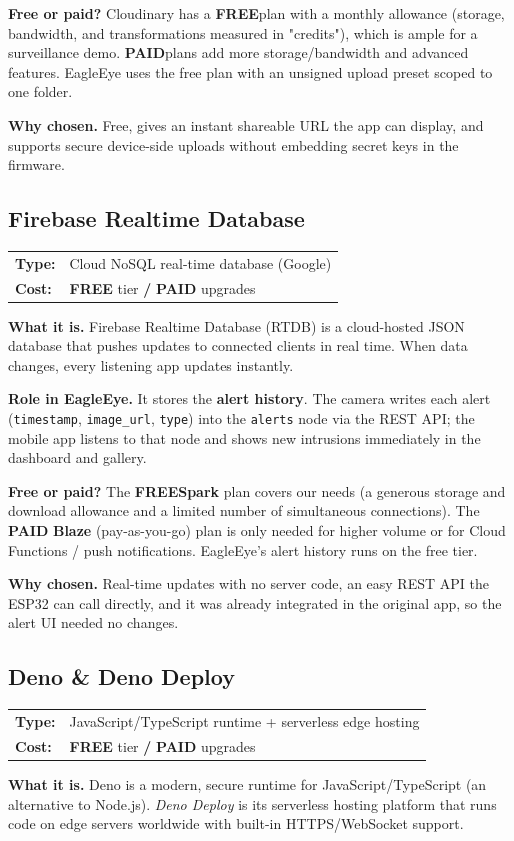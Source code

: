 \documentclass[11pt,a4paper]{article}
\makeatletter
\newcommand{\code}[1]{\texttt{#1}}
\newcommand{\free}{\textbf{\color{freegreen}FREE}}
\newcommand{\paid}{\textbf{\color{paidorange}PAID}}
\newcommand{\freepaid}{\textbf{\color{freegreen}FREE} tier \textbf{/} \textbf{\color{paidorange}PAID} upgrades}
\newcommand{\techhead}[2]{\par\vspace{0.3em}\noindent
  \begin{tabularx}{\linewidth}{@{}lX@{}}
  \textbf{Type:} & #1 \\
  \textbf{Cost:} & #2 \\
  \end{tabularx}\par\vspace{0.3em}}
\makeatother
\begin{document}
\textbf{Free or paid?} Cloudinary has a \free plan with a monthly allowance (storage,
bandwidth, and transformations measured in "credits"), which is ample for a surveillance demo.
\paid plans add more storage/bandwidth and advanced features. EagleEye uses the free plan with
an unsigned upload preset scoped to one folder.

\textbf{Why chosen.} Free, gives an instant shareable URL the app can display, and supports
secure device-side uploads without embedding secret keys in the firmware.

\subsection{Firebase Realtime Database}
\techhead{Cloud NoSQL real-time database (Google)}{\freepaid}
\textbf{What it is.} Firebase Realtime Database (RTDB) is a cloud-hosted JSON database that
pushes updates to connected clients in real time. When data changes, every listening app
updates instantly.

\textbf{Role in EagleEye.} It stores the \textbf{alert history}. The camera writes each alert
(\code{timestamp}, \code{image\_url}, \code{type}) into the \code{alerts} node via the REST
API; the mobile app listens to that node and shows new intrusions immediately in the dashboard
and gallery.

\textbf{Free or paid?} The \free \textbf{Spark} plan covers our needs (a generous storage and
download allowance and a limited number of simultaneous connections). The \paid
\textbf{Blaze} (pay-as-you-go) plan is only needed for higher volume or for Cloud Functions /
push notifications. EagleEye's alert history runs on the free tier.

\textbf{Why chosen.} Real-time updates with no server code, an easy REST API the ESP32 can call
directly, and it was already integrated in the original app, so the alert UI needed no changes.

\subsection{Deno \& Deno Deploy}
\techhead{JavaScript/TypeScript runtime + serverless edge hosting}{\freepaid}
\textbf{What it is.} Deno is a modern, secure runtime for JavaScript/TypeScript (an alternative
to Node.js). \emph{Deno Deploy} is its serverless hosting platform that runs code on edge
servers worldwide with built-in HTTPS/WebSocket support.
\end{document}
